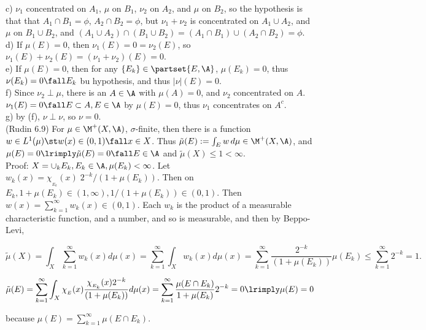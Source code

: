 \noindent
c) $\nu_1$ concentrated on $A_1$, $\mu$ on $B_1$, $\nu_2$ on $A_2$, and $\mu$ on $B_2$, so the hypothesis is that that $A_1 \cap B_1 = \phi$, $A_2 \cap B_2 = \phi$, but $\nu_1 + \nu_2$ is concentrated on $A_1 \cup A_2$, and $\mu$  on $B_1 \cup B_2$, and $(A_1 \cup A_2) \cap (B_1 \cup B_2) = (A_1 \cap B_1) \cup (A_2 \cap B_2) = \phi$. \\

\noindent
d) If $\mu(E) = 0$, then $\nu_1(E) = 0 = \nu_2(E)$, so $\nu_1(E) + \nu_2(E) = (\nu_1 + \nu_2)(E) = 0$.\\

\noindent
e) If $\mu(E) = 0$, then for any $\{ E_k \} \in \partset{E, \A}$, $\mu(E_k) = 0$, thus $\nu(E_k) = 0 \fall E_k$ bu hypothesis, and thus $|\nu|(E) = 0$.   \\

\noindent
f) Since $\nu_2 \perp \mu$, there is an $A \in \A$ with $\mu(A) = 0$, and $\nu_2$ concentrated on $A$. $\nu_1(E) = 0 \fall E \subset A, E \in \A$ by $\mu(E) = 0$, thus $\nu_1$ concentrates on $A^c$.  \\

\noindent
g) by (f), $\nu \perp \nu$, so $\nu = 0$.  \\


(Rudin 6.9) For $\mu \in \M^+(X, \A)$, $\sigma$-finite, then there is a function $w \in L^1(\mu) \st w(x) \in (0,1) \fall x \in X$. Thus $\tilde{\mu}(E) := \int_E w \, d\mu \in \M^+(X, \A)$, and $\mu(E) = 0 \lrimply \tilde{\mu}(E)=0 \fall E \in \A$   and $ \tilde{\mu}(X) \le 1 < \infty$. \\

\noindent
Proof: $X = \cup_k E_k, E_k \in \A, \mu(E_k) < \infty$. Let $w_k(x) = \chi_{_{E_k}}(x) \; 2^{-k}/ (1+\mu(E_k))$. Then on $E_k, 1+\mu(E_k) \in (1,\infty), 1/ (1+\mu(E_k)) \in (0,1)$. Then $w(x) = \sum_{k=1}^\infty w_k(x) \in (0,1)$. Each $w_k$ is the product of a measurable characteristic function, and a number, and so is measurable, and then by Beppo-Levi,

$$
    \tilde{\mu}(X) =  \int_X \sum_{k=1}^\infty w_k(x) d\mu(x) =  \sum_{k=1}^\infty  \int_X w_k(x) d\mu(x) =  \sum_{k=1}^\infty   \frac{2^{-k}}{ (1+\mu(E_k))}     \mu(E_k) \le \sum_{k=1}^\infty 2^{-k} = 1.
$$

$$
    \tilde{\mu}(E) =  \sum_{k=1}^\infty  \int_X \chi_{_{E}}(x) \frac{ \chi_{_{E_k}}(x)  2^{-k}}{ (1+\mu(E_k))} d\mu(x) = \sum_{k=1}^\infty \frac{ \mu(E \cap E_k ) }{ 1+\mu(E_k)} 2^{-k} = 0 \lrimply \mu(E) = 0
$$

\noindent
because $\mu(E) = \sum_{k=1}^\infty \mu(E \cap E_k)$.


